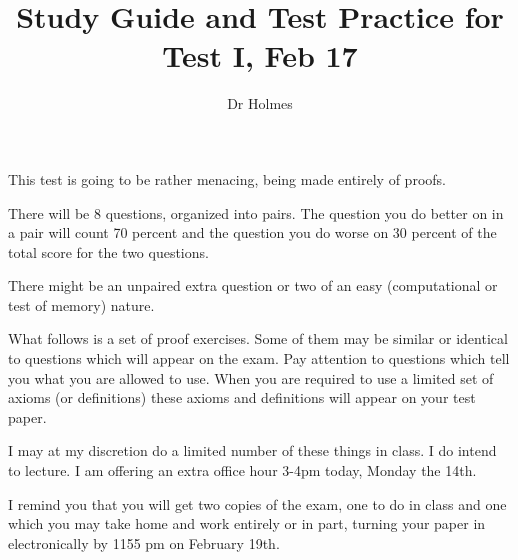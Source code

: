 \documentclass[12pt]{article}
\title{Study Guide and Test Practice for Test I, Feb 17}
\author{Dr Holmes}
\begin{document}
\maketitle

This test is going to be rather menacing, being made entirely of proofs.

There will be 8 questions, organized into pairs.  The question you do better on in a pair will count 70 percent
and the question you do worse on 30 percent of the total score for the two questions.

There might be an unpaired extra question or two of an easy (computational or test of memory) nature.

What follows is a set of proof exercises.  Some of them may be similar or identical  to questions which will appear on the exam.
Pay attention to questions which tell you what you are allowed to use.  When you are required to use a limited set of axioms (or definitions) these axioms and definitions will appear on your test paper.

I may at my discretion do a limited number of these things in class.  I do intend to lecture.  I am offering an extra office hour 3-4pm today, Monday the 14th.

I remind you that you will get two copies of the exam, one to do in class and one which you may take home and work entirely or in part, turning your paper in electronically by 1155 pm on February 19th.
\end{document}
